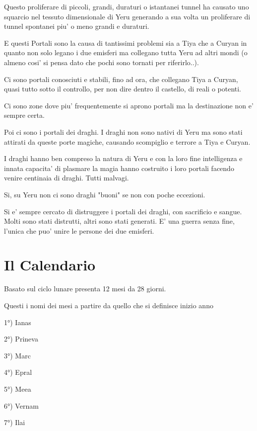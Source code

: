 \documentclass[a4paper,11pt,twoside,openany]{book}
\begin{document}
{Questo proliferare di piccoli, grandi, duraturi o istantanei tunnel ha causato uno squarcio nel tessuto dimensionale di Yeru generando a sua volta un proliferare di tunnel spontanei piu' o meno grandi e duraturi.

E questi Portali sono la causa di tantissimi problemi sia a Tiya che a Curyan in quanto non solo legano i due emisferi ma collegano tutta Yeru ad altri mondi (o almeno cosi' si pensa dato che pochi sono tornati per riferirlo..).

Ci sono portali conosciuti e stabili, fino ad ora, che collegano Tiya a Curyan, quasi tutto sotto il controllo, per non dire dentro il castello, di reali o potenti.

Ci sono zone dove piu' frequentemente si aprono portali ma la destinazione non e' sempre certa.

Poi ci sono i portali dei draghi. I draghi non sono nativi di Yeru ma sono stati attirati da queste porte magiche, causando scompiglio e terrore a Tiya e Curyan.

I draghi hanno ben compreso la natura di Yeru e con la loro fine intelligenza e innata capacita' di plasmare la magia hanno costruito i loro portali facendo venire centinaia di draghi. Tutti malvagi.

Si, su Yeru non ci sono draghi "buoni" se non con poche eccezioni.

Si e' sempre cercato di distruggere i portali dei draghi, con sacrificio e sangue. Molti sono stati distrutti, altri sono stati generati. E' una guerra senza fine, l'unica che puo' unire le persone dei due emisferi. 

\pagebreak

\section{Il Calendario}

\label{il-calendario}

Basato sul ciclo lunare presenta 12 mesi da 28 giorni.

Questi i nomi dei mesi a partire da quello che si definisce inizio
anno
\bigskip

1°) Ianas

2°) Prineva

3°) Marc

4°) Epral

5°) Meea

6°) Vernam

7°) Ilai

}
\end{document}
